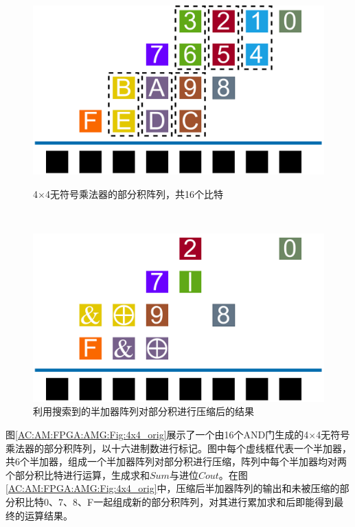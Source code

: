 \begin{figure}[!h]
    \begin{minipage}[t]{0.45\linewidth}
      \centering
      \includegraphics[width=\linewidth]{./figs/AC-AM-FPGA-AMG-4x4_orig.pdf}
      \caption{4$\times$4无符号乘法器的部分积阵列，共16个比特}
      \label{AC:AM:FPGA:AMG:Fig:4x4_orig}
    \end{minipage}
    \ \ \
    \begin{minipage}[t]{0.45\linewidth}
      \centering
      \includegraphics[width=\linewidth]{./figs/AC-AM-FPGA-AMG-4x4_compressed.pdf}
      \caption{利用搜索到的半加器阵列对部分积进行压缩后的结果}
      \label{AC:AM:FPGA:AMG:Fig:4x4_compressed}
    \end{minipage}
\end{figure}
图\ref{AC:AM:FPGA:AMG:Fig:4x4_orig}展示了一个由16个AND门生成的4$\times$4无符号乘法器的部分积阵列，以十六进制数进行标记。图中每个虚线框代表一个半加器，共6个半加器，组成一个半加器阵列对部分积进行压缩，阵列中每个半加器均对两个部分积比特进行运算，生成求和$Sum$与进位$Cout$。在图\ref{AC:AM:FPGA:AMG:Fig:4x4_orig}中，压缩后半加器阵列的输出和未被压缩的部分积比特0、7、8、F一起组成新的部分积阵列，对其进行累加求和后即能得到最终的运算结果。
